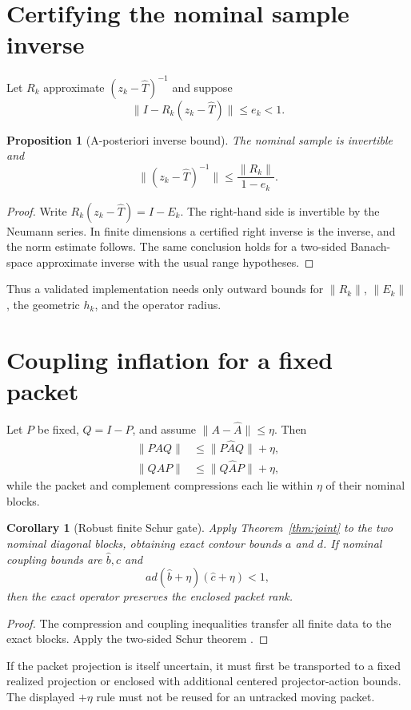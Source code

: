 \documentclass[12pt]{article}
\newtheorem{proposition}[theorem]{Proposition}
\newtheorem{corollary}[theorem]{Corollary}
\newcommand{\norm}[1]{\lVert#1\rVert}
\begin{document}
\section{Certifying the nominal sample inverse}
Let $R_k$ approximate $(z_k-\widehat T)^{-1}$ and suppose
\[
 \norm{I-R_k(z_k-\widehat T)}\le e_k<1.
\]

\begin{proposition}[A-posteriori inverse bound]
The nominal sample is invertible and
\[
 \norm{(z_k-\widehat T)^{-1}}
 \le\frac{\norm{R_k}}{1-e_k}.
\]
\end{proposition}
\begin{proof}
Write $R_k(z_k-\widehat T)=I-E_k$.  The right-hand side is invertible by the
Neumann series.  In finite dimensions a certified right inverse is the
inverse, and the norm estimate follows.  The same conclusion holds for a
two-sided Banach-space approximate inverse with the usual range hypotheses.
\end{proof}

Thus a validated implementation needs only outward bounds for
$\norm{R_k}$, $\norm{E_k}$, the geometric $h_k$, and the operator radius.

\section{Coupling inflation for a fixed packet}
Let $P$ be fixed, $Q=I-P$, and assume
$\norm{A-\widehat A}\le\eta$.  Then
\begin{align*}
 \norm{PAQ}&\le\norm{P\widehat A Q}+\eta,\\
 \norm{QAP}&\le\norm{Q\widehat A P}+\eta,
\end{align*}
while the packet and complement compressions each lie within $\eta$ of their
nominal blocks.

\begin{corollary}[Robust finite Schur gate]
Apply Theorem~\ref{thm:joint} to the two nominal diagonal blocks, obtaining
exact contour bounds $a$ and $d$.  If nominal coupling bounds are
$\widehat b,\widehat c$ and
\[
 ad(\widehat b+\eta)(\widehat c+\eta)<1,
\]
then the exact operator preserves the enclosed packet rank.
\end{corollary}
\begin{proof}
The compression and coupling inequalities transfer all finite data to the
exact blocks.  Apply the two-sided Schur theorem \citep{WangRH163}.
\end{proof}

If the packet projection is itself uncertain, it must first be transported
to a fixed realized projection or enclosed with additional centered
projector-action bounds.  The displayed $+\eta$ rule must not be reused for
an untracked moving packet.
\end{document}
